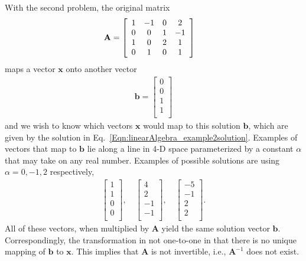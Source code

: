 With the second problem, the original matrix
\begin{align} 
  \mathbf{A} &=
  \left[ \begin{array}{c c c c} 
   1 & -1 &  0 &  2 \\
   0 &  0 &  1 & -1 \\
   1 &  0 &  2 &  1 \\
   0 &  1 &  0 &  1 \\ \end{array} \right] \nonumber
\end{align}
maps a vector $\mathbf{x}$ onto another vector
\begin{align}
  \mathbf{b} = \left[ \begin{array}{c} 0 \\ 0 \\ 1 \\ 1 \\ \end{array} \right] \nonumber
\end{align}
and we wish to know which vectors $\mathbf{x}$ would map to this solution $\mathbf{b}$, which are given by the solution in Eq.~\eqref{Eqn:linearAlgebra_example2solution}. Examples of vectors that map to $\mathbf{b}$ lie along a line in 4-D space parameterized by a constant $\alpha$ that may take on any real number. Examples of possible solutions are using $\alpha = 0, -1, 2$ respectively,
\begin{align}
  \left[ \begin{array}{c}  1 \\  1 \\  0  \\  0 \\ \end{array} \right] , \quad 
  \left[ \begin{array}{c}  4 \\  2 \\ -1  \\ -1 \\ \end{array} \right] , \quad
  \left[ \begin{array}{c} -5 \\ -1 \\  2  \\  2 \\ \end{array} \right] . \nonumber
\end{align}
All of these vectors, when multiplied by $\mathbf{A}$ yield the same solution vector $\mathbf{b}$. Correspondingly, the transformation in not one-to-one in that there is no unique mapping of $\mathbf{b}$ to $\mathbf{x}$. This implies that $\mathbf{A}$ is not invertible, i.e., $\mathbf{A}^{-1}$ does not exist.

